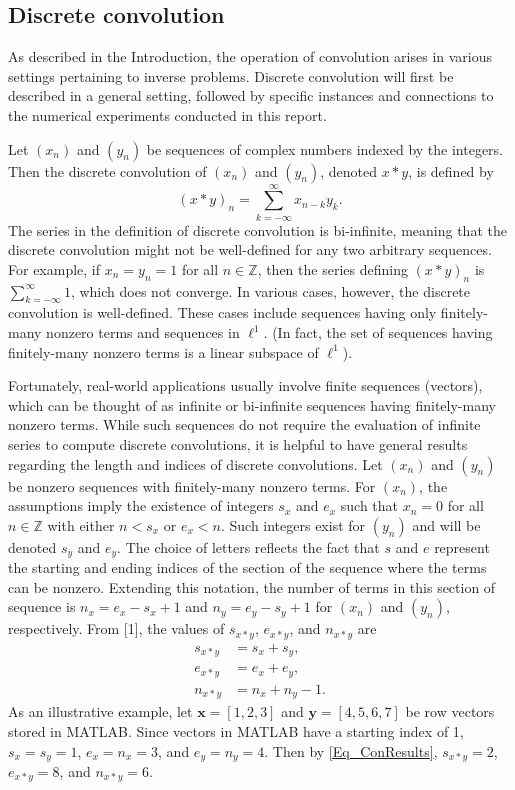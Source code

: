 \documentclass[12pt]{article}
\begin{document}
\subsection{Discrete convolution}
As described in the Introduction, the operation of convolution arises in various settings pertaining to inverse problems. Discrete convolution will first be described  in a general setting, followed by specific instances and connections to the numerical experiments conducted in this report. \par
Let $(x_n)$ and $(y_n)$ be sequences of complex numbers indexed by the integers. Then the discrete convolution of $(x_n)$ and $(y_n)$, denoted $x*y$, is defined by
\[(x*y)_n = \sum_{k=-\infty}^\infty x_{n-k}y_k.\]
The series in the definition of discrete convolution is bi-infinite, meaning that the discrete convolution might not be well-defined for any two arbitrary sequences. For example, if $x_n = y_n = 1$ for all $n \in \mathbb{Z}$, then the series defining $(x*y)_n$ is $\sum_{k=-\infty}^\infty 1$, which does not converge. In various cases, however, the discrete convolution is well-defined. These cases include sequences having only finitely-many nonzero terms and sequences in $\ell^1$. (In fact, the set of sequences having finitely-many nonzero terms is a linear subspace of $\ell^1$).  \par 
Fortunately, real-world applications usually involve finite sequences (vectors), which can be thought of as infinite or bi-infinite sequences having finitely-many nonzero terms. While such sequences do not require the evaluation of infinite series to compute discrete convolutions, it is helpful to have general results regarding the length and indices of discrete convolutions. Let $(x_n)$ and $(y_n)$ be nonzero sequences with finitely-many nonzero terms. For $(x_n)$, the assumptions imply the existence of integers $s_x$ and $e_x$ such that $x_n = 0$ for all $n \in \mathbb{Z}$ with either $n < s_x$ or $e_x < n$. Such integers exist for $(y_n)$ and will be denoted $s_y$ and $e_y$. The choice of letters reflects the fact that $s$ and $e$ represent the starting and ending indices of the section of the sequence where the terms can be nonzero. Extending this notation, the number of terms in this section of sequence is $n_x = e_x - s_x + 1$ and $n_y = e_y - s_y + 1$ for $(x_n)$ and $(y_n)$, respectively. From [1], the values of $s_{x*y}$, $e_{x*y}$, and $n_{x*y}$ are
\begin{align}
s_{x*y} &= s_x + s_y, \nonumber \\
e_{x*y} &= e_x + e_y, \label{Eq_ConResults} \\
n_{x*y} &= n_x + n_y - 1. \nonumber
\end{align}
As an illustrative example, let $\mathbf{x} = [1,2,3]$ and $\mathbf{y} = [4,5,6,7]$ be row vectors stored in MATLAB. Since vectors in MATLAB have a starting index of 1, $s_x = s_y = 1$, $e_x = n_x = 3$, and $e_y = n_y = 4$. Then by \eqref{Eq_ConResults}, $s_{x*y} = 2$, $e_{x*y} = 8$, and $n_{x*y} = 6$. 
\end{document}
